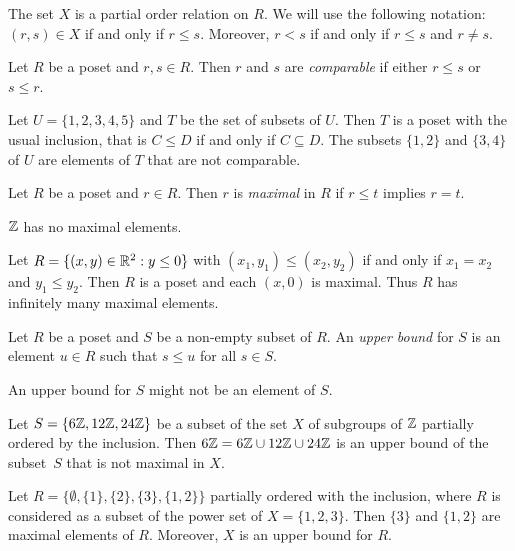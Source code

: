 The set $X$ is a partial order relation on $R$.  
We will use the following notation: $(r,s)\in X$ if and only if $r\leq s$. Moreover, 
$r<s$ if and only if $r\leq s$ and $r\ne s$. 

\begin{definition}
Let $R$ be a poset and $r,s\in R$. Then $r$ and $s$ are \emph{comparable}
if either $r\leq s$ or $s\leq r$.
\end{definition}

\begin{example}
    Let $U=\{1,2,3,4,5\}$ and $T$ be the set of subsets of $U$. Then $T$ is a poset
    with the usual inclusion, that is $C\leq D$ if and only if $C\subseteq D$. The subsets
    $\{1,2\}$ and $\{3,4\}$ of $U$ are elements of $T$ that are not comparable. 
\end{example}

\begin{definition}
    Let $R$ be a poset and $r\in R$. Then $r$ is \emph{maximal} in $R$ if 
    $r\leq t$ implies $r=t$. 
\end{definition}

\begin{example}
    $\mathbb{Z}$ has no maximal elements. 
\end{example}

\begin{example}
Let $R=\{(x,y)\in\mathbb{R}^2:y\leq0\}$ with $(x_1,y_1)\leq(x_2,y_2)$ if and only if $x_1=x_2$ and $y_1\leq y_2$. Then
$R$ is a poset and each $(x,0)$ is maximal. Thus $R$ has infinitely many maximal elements.
\end{example}

\begin{definition}
    Let $R$ be a poset and $S$ be a non-empty subset of $R$. An \emph{upper bound}
    for $S$ is an element $u\in R$ such that $s\leq u$ for all $s\in S$. 
\end{definition}

An upper bound for $S$ might not be an element of $S$. 

\begin{example}
    Let $S=\{6\mathbb{Z},12\mathbb{Z},24\mathbb{Z}\}$ be a subset of the set $X$ 
    of subgroups of $\mathbb{Z}$ partially ordered by 
    the inclusion. Then 
    $6\mathbb{Z}=6\mathbb{Z}\cup 12\mathbb{Z}\cup 24\mathbb{Z}$ is an upper bound of the subset~$S$ 
    that is not maximal in $X$. 
\end{example}

\begin{example}
    Let $R=\{\emptyset, \{1\},\{2\},\{3\},\{1,2\}\}$ partially ordered with
    the inclusion, where $R$ is considered as a subset
    of the power set of $X=\{1,2,3\}$. 
    Then $\{3\}$ and $\{1,2\}$ are maximal elements of $R$. Moreover, 
    $X$ is an upper bound for $R$. 
\end{example}


